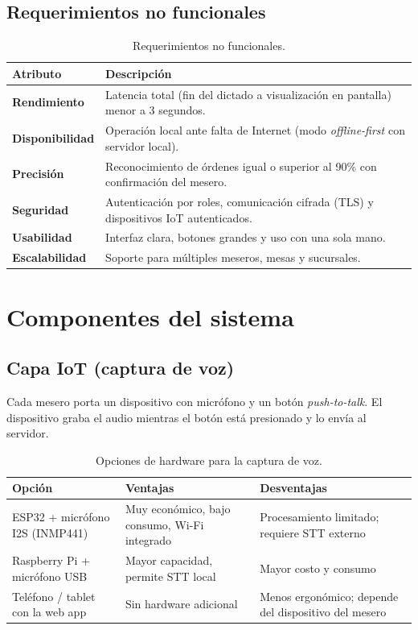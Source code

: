 \documentclass[11pt,letterpaper]{article}
\newcommand{\tabhead}[1]{\textbf{\color{white}#1}}
\newcommand{\encabezado}{\rowcolor{azulprincipal}}
\begin{document}
\subsection{Requerimientos no funcionales}
\begin{table}[h!]
\centering
\begin{tabularx}{\textwidth}{>{\bfseries}l X}
\toprule
\encabezado \tabhead{Atributo} & \tabhead{Descripción} \\
\midrule
Rendimiento & Latencia total (fin del dictado a visualización en pantalla) menor a 3 segundos. \\
Disponibilidad & Operación local ante falta de Internet (modo \textit{offline-first} con servidor local). \\
Precisión & Reconocimiento de órdenes igual o superior al 90\% con confirmación del mesero. \\
Seguridad & Autenticación por roles, comunicación cifrada (TLS) y dispositivos IoT autenticados. \\
Usabilidad & Interfaz clara, botones grandes y uso con una sola mano. \\
Escalabilidad & Soporte para múltiples meseros, mesas y sucursales. \\
\bottomrule
\end{tabularx}
\caption{Requerimientos no funcionales.}
\end{table}

\section{Componentes del sistema}
\subsection{Capa IoT (captura de voz)}
Cada mesero porta un dispositivo con micrófono y un botón \textit{push-to-talk}. El dispositivo graba el audio mientras el botón está presionado y lo envía al servidor.

\begin{table}[h!]
\centering
\begin{tabularx}{\textwidth}{l X X}
\toprule
\encabezado \tabhead{Opción} & \tabhead{Ventajas} & \tabhead{Desventajas} \\
\midrule
ESP32 + micrófono I2S (INMP441) & Muy económico, bajo consumo, Wi-Fi integrado & Procesamiento limitado; requiere STT externo \\
Raspberry Pi + micrófono USB & Mayor capacidad, permite STT local & Mayor costo y consumo \\
Teléfono / tablet con la web app & Sin hardware adicional & Menos ergonómico; depende del dispositivo del mesero \\
\bottomrule
\end{tabularx}
\caption{Opciones de hardware para la captura de voz.}
\end{table}
\end{document}

